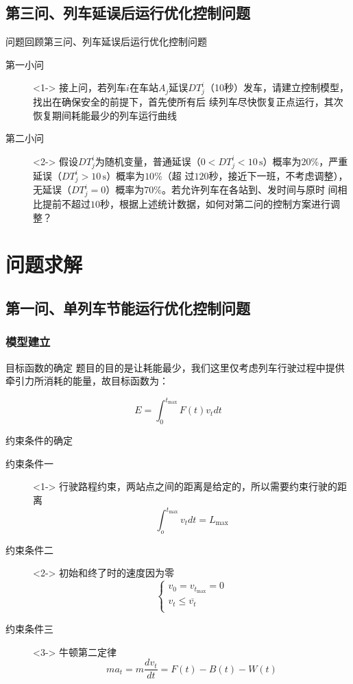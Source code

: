 \documentclass{beamer}
\begin{document}
\subsection{第三问、列车延误后运行优化控制问题}
\begin{frame}{问题回顾}{第三问、列车延误后运行优化控制问题}
\begin{description}
  \item[第一小问]<1-> 接上问，若列车$i$在车站$A_j$延误$DT_j^i$（10秒）发车，请建立控制模型，找出在确保安全的前提下，首先使所有后
续列车尽快恢复正点运行，其次恢复期间耗能最少的列车运行曲线
  \item[第二小问]<2-> 假设$DT_j^i$为随机变量，普通延误（$0<DT_j^i <10 \, \mathrm{s}$）概率为$20\%$，严重延误（$DT_j^i >10 \, \mathrm{s}$）概率为$10\%$（超
过$120$秒，接近下一班，不考虑调整），无延误（$DT_j^i= 0$）概率为$70\%$。若允许列车在各站到、发时间与原时
间相比提前不超过$10$秒，根据上述统计数据，如何对第二问的控制方案进行调整？
\end{description}
\end{frame}

\section{问题求解}
\subsection{第一问、单列车节能运行优化控制问题}
\subsubsection{模型建立}
\begin{frame}{目标函数的确定}
题目的目的是让耗能最少，我们这里仅考虑列车行驶过程中提供牵引力所消耗的能量，故目标函数为：

\[E = \int_0^{{t_{\max }}} {F\left( t \right){v_t}dt} \]

\end{frame}

\begin{frame}{约束条件的确定}
\begin{description}
  \item[约束条件一]<1-> 行驶路程约束，两站点之间的距离是给定的，所以需要约束行驶的距离
    \[\int_o^{{t_{\max }}} {{v_t}dt}  = {L_{\max }}\]
  \item[约束条件二]<2-> 初始和终了时的速度因为零
    \[\left\{ \begin{array}{l}
 {v_0} = {v_{{t_{\max }}}} = 0 \\
 {v_t} \le \overline {{v_t}}  \\
 \end{array} \right.\]
  \item[约束条件三]<3-> 牛顿第二定律
    \[m{a_t} = m\frac{{d{v_t}}}{{dt}} = F\left( t \right) - B\left( t \right) - W\left( t \right)\]
\end{description}

\end{frame}
\end{document}
